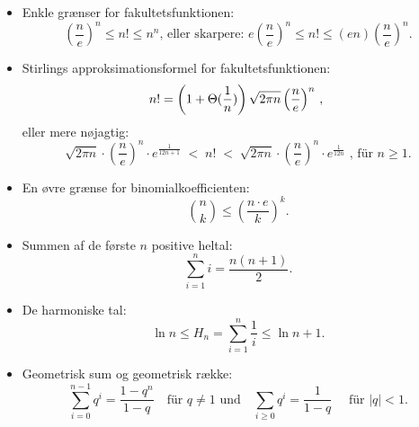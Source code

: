 \begin{itemize}
  \item Enkle grænser for fakultetsfunktionen:
    \begin{equation}\label{eq:factorial}
      \left(\frac{n}{e}\right)^n \le n! \le n^n \text{, eller skarpere: } e \left(\frac{n}{e}\right)^n \le n! \le (en)\left(\frac{n}{e}\right)^n.
    \end{equation}

  \item 
    Stirlings approksimationsformel for fakultetsfunktionen:
    \begin{equation}\label{eq:stirling}
      n! = \left(1+\Theta(\frac{1}{n})\right)\sqrt{2\pi n}\left(\frac{n}{e}\right)^n \,,\
    \end{equation}
    eller mere nøjagtig:
    \begin{equation}\tag*{(A.9$'$)}
      \sqrt{2\pi n}\cdot\left(\frac{n}{e}\right)^n \cdot e^{\frac1{12n+1}}
      \; < \;  n!  \; < \; 
      \sqrt{2\pi n}\cdot\left(\frac{n}{e}\right)^n \cdot e^{\frac1{12n}}\mbox{ , für $n\ge1$.}
    \end{equation}

  \item En øvre grænse for binomialkoefficienten:
    \begin{equation}\label{eq:bincoeff}
      \binom{n}{k}\leq\left(\frac{n\cdot e}{k}\right)^k .
    \end{equation}

  \item
    Summen af de første $n$ positive heltal:
    \begin{equation}\label{eq:sumi}
      \sum_{i=1}^ni = \frac{n(n+1)}{2} .
    \end{equation}


  \item De harmoniske tal:
    \begin{equation}\label{eq:harmonic}
      \ln n\leq H_n=\sum_{i=1}^n \frac{1}{i}\leq \ln n+1 .
    \end{equation}


  \item 
    Geometrisk sum og geometrisk række:
    \begin{equation}\label{eq:geometric}
      \sum_{i=0}^{n-1}q^i=\frac{1-q^n}{1-q} \quad\text{für $q \not= 1$ und}\quad \sum_{i \ge 0} q^i =
      \frac{1}{1 - q} \quad \text{ für $|q| < 1$} .
    \end{equation}


\end{itemize}

